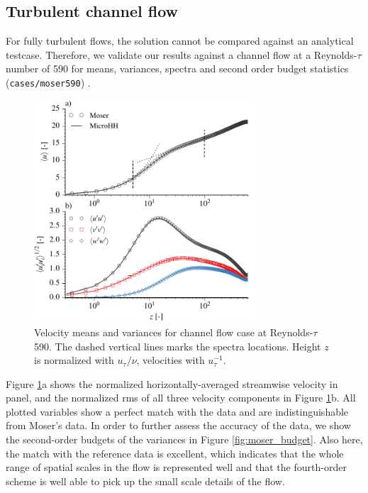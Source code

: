 \documentclass[gmd]{copernicus}
\begin{document}
\subsection{Turbulent channel flow}
For fully turbulent flows, the solution cannot be compared against an analytical testcase. Therefore, we validate our results against a channel flow at a Reynolds-$\tau$ number of 590 \citep{Moser1999} for means, variances, spectra and second order budget statistics (\texttt{cases/moser590}) .
\begin{figure}[t]
	\vspace*{2mm}
	\begin{center}
		\includegraphics[width=8.3cm]{figs/gmd_m590_umean_var.pdf}
	\end{center}
	\caption{Velocity means and variances for \citet{Moser1999} channel flow case at Reynolds-$\tau$ 590. The dashed vertical lines marks the spectra locations. Height $z$ is normalized with $u_\tau / \nu$, velocities with $u_\tau^{-1}$.}\label{fig:moser_velocity}
\end{figure}

Figure \ref{fig:moser_velocity}a shows the normalized horizontally-averaged streamwise velocity in panel, and the normalized rms of all three velocity components in Figure \ref{fig:moser_velocity}b. All plotted variables show a perfect match with the data and are indistinguishable from Moser's data. In order to further assess the accuracy of the data, we show the second-order budgets of the variances in Figure \ref{fig:moser_budget}. Also here, the match with the reference data is excellent, which indicates that the whole range of spatial scales in the flow is represented well and that the fourth-order scheme is well able to pick up the small scale details of the flow.
\end{document}
